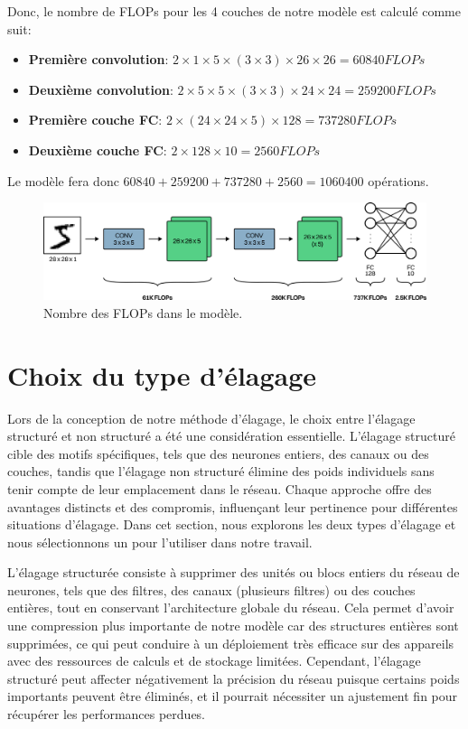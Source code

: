 Donc, le nombre de FLOPs pour les 4 couches de notre modèle est calculé comme suit:
\begin{itemize}
    \item \textbf{Première convolution}: $2 × 1 × 5 × (3 × 3) × 26 × 26 = 60 840 FLOPs$
    \item \textbf{Deuxième convolution}: $2 × 5 × 5 × (3 × 3) × 24 × 24 = 259 200 FLOPs$
    \item \textbf{Première couche FC}: $2 × (24 × 24 × 5) × 128 = 737 280 FLOPs$
    \item \textbf{Deuxième couche FC}: $2 × 128 × 10 = 2 560 FLOPs$
\end{itemize}
Le modèle fera donc  $60 840 + 259 200 + 737 280 + 2 560 = 1 060 400$ opérations.

\begin{figure}[hbt!]
  \centering
  \includegraphics[width=15cm]{images_pfe/mnist.png}
  \caption{Nombre des FLOPs dans le modèle.}
  \label{fig:mnist}
\end{figure}
\FloatBarrier
\medskip

\section{Choix du type d'élagage}
Lors de la conception de notre méthode d'élagage, le choix entre l'élagage structuré et non structuré a été une considération essentielle. L'élagage structuré cible des motifs spécifiques, tels que des neurones entiers, des canaux ou des couches, tandis que l'élagage non structuré élimine des poids individuels sans tenir compte de leur emplacement dans le réseau. Chaque approche offre des avantages distincts et des compromis, influençant leur pertinence pour différentes situations d'élagage. Dans cet section, nous explorons les deux types d'élagage et nous sélectionnons un pour l'utiliser dans notre travail.

L'élagage structurée consiste à supprimer des unités ou blocs entiers du réseau de neurones, tels que des filtres, des canaux (plusieurs filtres) ou des couches entières, tout en conservant l'architecture globale du réseau. Cela permet d'avoir une compression plus importante de notre modèle car des structures entières sont supprimées, ce qui peut conduire à un déploiement très efficace sur des appareils avec des ressources de calculs et de stockage limitées. Cependant, l'élagage structuré peut affecter négativement la précision du réseau puisque certains poids importants peuvent être éliminés, et il pourrait nécessiter un ajustement fin pour récupérer les performances perdues.

